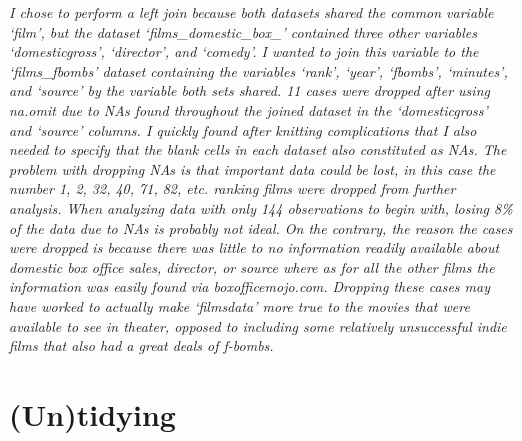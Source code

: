 \documentclass[]{article}
\newenvironment{Shaded}{\begin{snugshade}}{\end{snugshade}}
\newcommand{\DataTypeTok}[1]{\textcolor[rgb]{0.13,0.29,0.53}{#1}}
\newcommand{\KeywordTok}[1]{\textcolor[rgb]{0.13,0.29,0.53}{\textbf{#1}}}
\newcommand{\NormalTok}[1]{#1}
\newcommand{\OperatorTok}[1]{\textcolor[rgb]{0.81,0.36,0.00}{\textbf{#1}}}
\newcommand{\StringTok}[1]{\textcolor[rgb]{0.31,0.60,0.02}{#1}}
\begin{document}
\emph{I chose to perform a left join because both datasets shared the
common variable `film', but the dataset `films\_domestic\_box\_'
contained three other variables `domesticgross', `director', and
`comedy'. I wanted to join this variable to the `films\_fbombs' dataset
containing the variables `rank', `year', `fbombs', `minutes', and
`source' by the variable both sets shared. 11 cases were dropped after
using na.omit due to NAs found throughout the joined dataset in the
`domesticgross' and `source' columns. I quickly found after knitting
complications that I also needed to specify that the blank cells in each
dataset also constituted as NAs. The problem with dropping NAs is that
important data could be lost, in this case the number 1, 2, 32, 40, 71,
82, etc. ranking films were dropped from further analysis. When
analyzing data with only 144 observations to begin with, losing 8\% of
the data due to NAs is probably not ideal. On the contrary, the reason
the cases were dropped is because there was little to no information
readily available about domestic box office sales, director, or source
where as for all the other films the information was easily found via
boxofficemojo.com. Dropping these cases may have worked to actually make
`filmsdata' more true to the movies that were available to see in
theater, opposed to including some relatively unsuccessful indie films
that also had a great deals of f-bombs.}

\hypertarget{untidying}{%
\section{(Un)tidying}\label{untidying}}

\begin{Shaded}
\end{Shaded}
\end{document}
